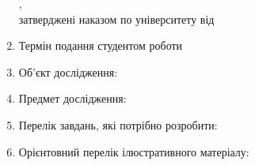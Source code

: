 \begin{spacing}{1.1}
\begin{enumerate}[label*=\arabic*., labelindent=0pt, itemindent=0cm]
	\noindent{},\vspace{-3mm}\\	
	
	\noindent затверджені наказом по університету від \@univapproved
	\item Термін подання студентом роботи \@submission
	\item Об’єкт дослідження: \@searchobject
	\item Предмет дослідження: \@predmet
	\item Перелік завдань, які потрібно розробити: \@tasks
	\item Орієнтовний перелік ілюстративного матеріалу: \@illustrations
	
\end{enumerate}	



\restoregeometry


\end{spacing}

